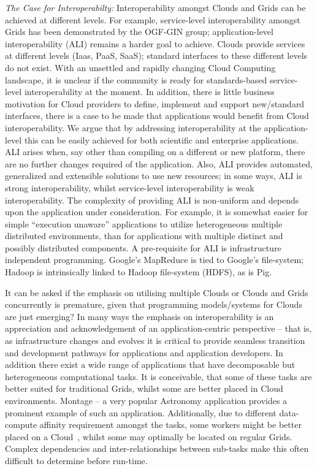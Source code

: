 \documentclass[3p,twocolumn]{elsarticle}
\begin{document}
{\it The Case for Interoperabilty:} Interoperability amongst Clouds
and Grids can be achieved at different levels. For example,
service-level interoperability amongst Grids has been demonstrated by
the OGF-GIN group; application-level interoperability (ALI) remains a
harder goal to achieve.  Clouds provide services at different levels
(Iaas, PaaS, SaaS); standard interfaces to these different levels do
not exist.  With an unsettled and rapidly changing Cloud Computing
landscape, it is unclear if the community is ready for standards-based
service-level interoperability at the moment.  In addition, there is
little business motivation for Cloud providers to define, implement
and support new/standard interfaces, there is a case to be made that
applications would benefit from Cloud interoperability.  We argue that
by addressing interoperability at the application-level this can be
easily achieved for both scientific and enterprise
applications.  %
ALI arises when, say other than compiling on a different or new
platform, there are no further changes required of the
application. Also, ALI provides automated, generalized and extensible
solutions to use new resources; in some ways, ALI is strong
interoperability, whilst service-level interoperability is weak
interoperability.  The complexity of providing ALI is non-uniform and
depends upon the application under consideration. For example, it is
somewhat easier for simple ``execution unaware'' applications to
utilize heterogeneous multiple distributed environments, than for
applications with multiple distinct and possibly distributed
components. A pre-requisite for ALI is infrastructure independent
programming. Google's MapReduce is tied to Google's file-system;
Hadoop is intrinsically linked to Hadoop file-system (HDFS), as is
Pig.

It can be asked if the emphasis on utilising multiple Clouds or Clouds
and Grids concurrently is premature, given that programming
models/systems for Clouds are just emerging? In many ways the emphasis
on interoperability is an appreciation and acknowledgement of an
application-centric perspective -- that is, as infrastructure changes
and evolves it is critical to provide seamless transition and
development pathways for applications and application developers. In
addition there exist a wide range of applications that have
decomposable but heterogeneous computational tasks. It is conceivable,
that some of these tasks are better suited for traditional Grids,
whilst some are better placed in Cloud environments. Montage -- a very
popular Astronomy application provides a prominent example of such an
application.  Additionally, due to different data-compute affinity
requirement amongst the tasks, some workers might be better placed on
a Cloud~\cite{jha_ccpe09}, whilst some may optimally be located on
regular Grids.  Complex dependencies and inter-relationships between
sub-tasks make this often difficult to determine before run-time.
\end{document}
